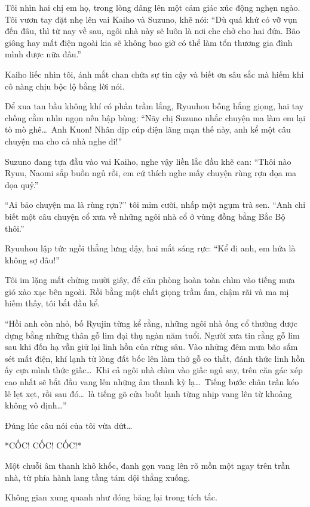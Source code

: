 \documentclass[../main.tex]{subfiles}
\begin{document}
Tôi nhìn hai chị em họ, trong lòng dâng lên một cảm giác xúc động nghẹn ngào. Tôi vươn tay đặt nhẹ lên vai Kaiho và Suzuno, khẽ nói: ``Dù quá khứ có vỡ vụn đến đâu, thì từ nay về sau, ngôi nhà này sẽ luôn là nơi che chở cho hai đứa. Bão giông hay mất điện ngoài kia sẽ không bao giờ có thể làm tổn thương gia đình mình được nữa đâu.''

Kaiho liếc nhìn tôi, ánh mắt chan chứa sự tin cậy và biết ơn sâu sắc mà hiếm khi cô nàng chịu bộc lộ bằng lời nói.

\ct

Để xua tan bầu không khí có phần trầm lắng, Ryuuhou bỗng hắng giọng, hai tay chống cằm nhìn ngọn nến bập bùng: ``Nãy chị Suzuno nhắc chuyện ma làm em lại tò mò ghê\dots\ Anh Kuon! Nhân dịp cúp điện lãng mạn thế này, anh kể một câu chuyện ma cho cả nhà nghe đi!''

Suzuno đang tựa đầu vào vai Kaiho, nghe vậy liền lắc đầu khẽ can: ``Thôi nào Ryuu, Naomi sắp buồn ngủ rồi, em cứ thích nghe mấy chuyện rùng rợn dọa ma dọa quỷ.''

``Ai bảo chuyện ma là rùng rợn?'' tôi mỉm cười, nhấp một ngụm trà sen. ``Anh chỉ biết một câu chuyện cổ xưa về những ngôi nhà cổ ở vùng đồng bằng Bắc Bộ thôi.''

Ryuuhou lập tức ngồi thẳng lưng dậy, hai mắt sáng rực: ``Kể đi anh, em hứa là không sợ đâu!''

Tôi im lặng mất chừng mười giây, để căn phòng hoàn toàn chìm vào tiếng mưa gió xào xạc bên ngoài. Rồi bằng một chất giọng trầm ấm, chậm rãi và ma mị hiếm thấy, tôi bắt đầu kể.

``Hồi anh còn nhỏ, bố Ryujin từng kể rằng, những ngôi nhà ống cổ thường được dựng bằng những thân gỗ lim đại thụ ngàn năm tuổi. Người xưa tin rằng gỗ lim sau khi đốn hạ vẫn giữ lại linh hồn của rừng sâu. Vào những đêm mưa bão sấm sét mất điện, khí lạnh từ lòng đất bốc lên làm thớ gỗ co thắt, đánh thức linh hồn ấy cựa mình thức giấc\dots\ Khi cả ngôi nhà chìm vào giấc ngủ say, trên căn gác xép cao nhất sẽ bắt đầu vang lên những âm thanh kỳ lạ\dots\ Tiếng bước chân trần kéo lê lẹt xẹt, rồi sau đó\dots\ là tiếng gõ cửa buốt lạnh từng nhịp vang lên từ khoảng không vô định\dots''

Đúng lúc câu nói của tôi vừa dứt\dots

*CỐC! CỐC! CỐC!*

Một chuỗi âm thanh khô khốc, đanh gọn vang lên rõ mồn một ngay trên trần nhà, từ phía hành lang tầng tám dội thẳng xuống.

Không gian xung quanh như đóng băng lại trong tích tắc.
\end{document}

